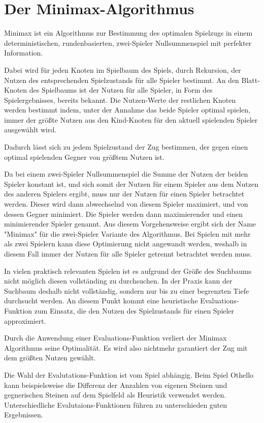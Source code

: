 \section{Der Minimax-Algorithmus}

Minimax ist ein Algorithmus zur Bestimmung des optimalen Spielzugs in einem deterministischen, rundenbasierten, zwei-Spieler Nullsummenspiel mit perfekter Information.

Dabei wird für jeden Knoten im Spielbaum des Spiels, durch Rekursion, der Nutzen des entsprechenden Spielzustands für alle Spieler bestimmt.
An den Blatt-Knoten des Spielbaums ist der Nutzen für alle Spieler, in Form des Spielergebnisses, bereits bekannt.
Die Nutzen-Werte der restlichen Knoten werden bestimmt indem, unter der Annahme das beide Spieler optimal spielen, immer der größte Nutzen aus den Kind-Knoten für den aktuell spielenden Spieler ausgewählt wird.
\cite[S.~165]{ai2010russel}

Dadurch lässt sich zu jedem Spielzustand der Zug bestimmen, der gegen einen optimal spielenden Gegner von größtem Nutzen ist.

Da bei einem zwei-Spieler Nullsummenspiel die Summe der Nutzen der beiden Spieler konstant ist, und sich somit der Nutzen für einem Spieler aus dem Nutzen des anderen Spielers ergibt, muss nur der Nutzen
für einen Spieler betrachtet werden. Dieser wird dann abwechselnd von diesem Spieler maximiert, und von dessen Gegner minimiert. Die Spieler werden dann maximierender und einen minimierender Spieler genannt.
Aus diesem Vorgehensweise ergibt sich der Name "Minimax" für die zwei-Spieler Variante des Algorithmus.
Bei Spielen mit mehr als zwei Spielern kann diese Optimierung nicht angewandt werden, weshalb in diesem Fall immer der Nutzen für alle Spieler getrennt betrachtet werden muss.
\cite[S.~165]{ai2010russel}

In vielen praktisch relevanten Spielen ist es aufgrund der Größe des Suchbaums nicht möglich diesen vollständing zu durchsuchen.
In der Praxis kann der Suchbaum deshalb nicht vollständig, sondern nur bis zu einer begrenzten Tiefe durchsucht werden. An diesem Punkt kommt eine heuristische Evaluations-Funktion zum Einsatz,
die den Nutzen des Spielzustands für einen Spieler approximiert.
\cite[S.~171]{ai2010russel}

Durch die Anwendung einer Evaluations-Funktion verliert der Minimax Algorithmus seine Optimalität. Es wird also nichtmehr garantiert der Zug mit dem größten Nutzen gewählt.

Die Wahl der Evalutations-Funktion ist vom Spiel abhängig. Beim Spiel Othello kann beispielsweise die Differenz der Anzahlen von eigenen Steinen und gegnerischen Steinen auf dem Spielfeld als Heuristik verwendet werden.
Unterschiedliche Evalutaions-Funktionen führen zu unterschieden guten Ergebnissen.


